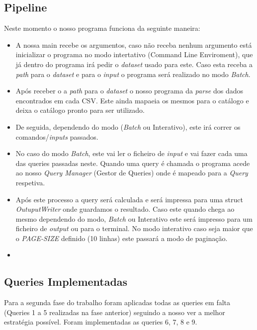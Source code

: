 \documentclass{article}
\begin{document}
        
    \subsection{Pipeline}
        Neste momento o nosso programa funciona da seguinte maneira:
        \begin{itemize}
            \item A nossa main recebe os argumentos, caso não receba nenhum argumento 
            está inicializar o programa no modo intertativo (Command Line Enviroment), 
            que já dentro do programa irá pedir o \emph{dataset} usado para este. Caso 
            esta receba a \emph{path} para o \emph{dataset} e para o \emph{input} o programa 
            será realizado no modo \emph{Batch}.
            \item Após receber o a \emph{path} para o \emph{dataset} o nosso programa da
            \emph{parse} dos dados encontrados em cada CSV. Este ainda mapaeia os mesmos 
            para o catálogo e deixa o catálogo pronto para ser utilizado.
            \item De seguida, dependendo do modo (\emph{Batch} ou Interativo), este irá 
            correr os comandos/\emph{inputs} passados.
            \item No caso do modo \emph{Batch}, este vai ler o ficheiro de \emph{input} 
            e vai fazer cada uma das queries passadas neste. Quando uma query é chamada 
            o programa acede ao nosso \emph{Query Manager} (Gestor de Queries) onde é 
            mapeado para a \emph{Query} respetiva. 
            \item Após este processo a query será calculada e será impressa para uma struct
            \emph{OutuputWriter} onde guardamos o resultado. Caso este quando chega ao mesmo 
            dependendo do modo, \emph{Batch} ou Interativo este será impresso para um ficheiro
            de \emph{output} ou para o terminal. No modo interativo caso seja maior que o 
            \emph{PAGE-SIZE} definido (10 linhas) este passará a modo de paginação.
            \item 
            
        \end{itemize}
    \subsection{Queries Implementadas}
        Para a segunda fase do trabalho foram aplicadas todas as queries em falta
        (Queries 1 a 5 realizadas na fase anterior) seguindo a nosso ver a melhor
        estratégia possível. Foram implementadas as queries 6, 7, 8 e 9.
\end{document}
